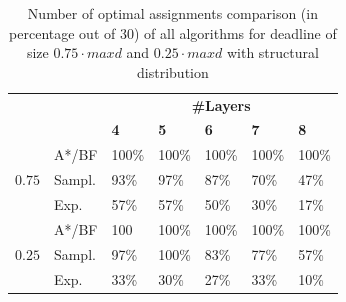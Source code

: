 \documentclass[letterpaper]{article} %
\newcommand{\astar}{\textsc{A*}\xspace}
\begin{document}
\begin{table}[]
\centering
\small
\begin{tabular}{|l|l|l|l|l|l|l|}
\hline
\multirow{2}{*}{\textbf{}} & \multirow{2}{*}{\textbf{}} & \multicolumn{5}{c|}{\textbf{\#Layers}}                         \\ \cline{3-7}
                                   &                                     & \textbf{4} & \textbf{5} & \textbf{6} & \textbf{7} & \textbf{8} \\ \hline
\multirow{3}{*}{$0.75$}  & \astar/BF                                  & 100\%         & 100\%         & 100\%         & 100\%         & 100\%         \\ \cline{2-7}
                                   & Sampl.                            & 93\%         & 97\%         & 87\%         & 70\%         & 47\%         \\ \cline{2-7}
                                   & Exp.                         & 57\%         & 57\%         & 50\%         & 30\%          & 17\%          \\ \hline
\multirow{3}{*}{$0.25$}  & \astar/BF                                  & 100         & 100\%         & 100\%         & 100\%         & 100\%         \\ \cline{2-7}
                                   & Sampl.                            & 97\%         & 100\%         & 83\%         & 77\%         & 57\%         \\ \cline{2-7}
                                   & Exp.                         & 33\%         & 30\%          & 27\%          & 33\%         & 10\%          \\ \hline
\end{tabular}
\caption{Number of optimal assignments comparison (in percentage out of 30) of all algorithms for deadline of size $0.75\cdot maxd$ and $0.25\cdot maxd$ with structural distribution}\label{tableOptAssgn}
\end{table}
\end{document}
